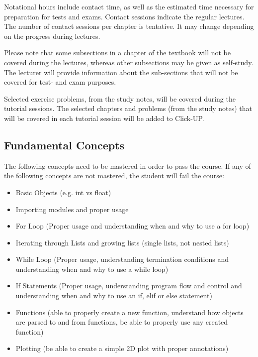         Notational hours include contact time, as well as the estimated time
        necessary for preparation for tests and exams. Contact sessions indicate
        the regular lectures. The number of contact sessions per chapter is
        tentative. It may change depending on the progress during lectures.

        Please note that some subsections in a chapter of the textbook will not be
        covered during the lectures, whereas other subsections may be given as
        self-study. The lecturer will provide information about the sub-sections
        that will not be covered for test- and exam purposes.

        Selected exercise problems, from the study notes, will be covered during
        the tutorial sessions. The selected chapters and problems (from the study
        notes) that will be covered in each tutorial session will be added to
        Click-UP.

    \subsection{Fundamental Concepts}
        The following concepts need to be mastered in order to pass the course.
        If any of the following concepts are not mastered, the student will
        fail the course:
        \begin{itemize}
            \item Basic Objects (e.g. int vs float)
            \item Importing modules and proper usage
            \item For Loop (Proper usage and understanding when and why to use
                a for loop)
            \item Iterating through Lists and growing lists (single lists, not
                nested lists)
            \item While Loop (Proper usage, understanding termination
                conditions and understanding when and why to use a while loop)
            \item If Statements (Proper usage, understanding program flow and
                control and understanding when and why to use an if, elif or
                else statement)
            \item Functions (able to properly create a new function, understand
                how objects are parsed to and from functions, be able to
                properly use any created function)
            \item Plotting (be able to create a simple 2D plot with proper
                annotations)
        \end{itemize}


